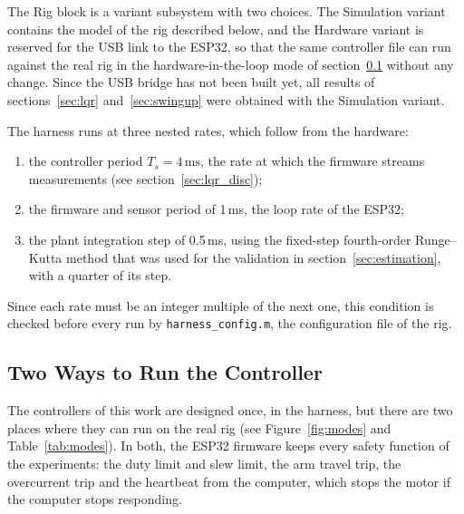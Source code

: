 \documentclass[a4paper,11pt]{article}
\begin{document}
The Rig block is a variant subsystem with two choices. The Simulation variant contains the model of the rig described below, and the Hardware variant is reserved for the USB link to the ESP32, so that the same controller file can run against the real rig in the hardware-in-the-loop mode of section~\ref{sec:harness_modes} without any change. Since the USB bridge has not been built yet, all results of sections~\ref{sec:lqr} and~\ref{sec:swingup} were obtained with the Simulation variant.

The harness runs at three nested rates, which follow from the hardware:
\begin{enumerate}
  \item the controller period $T_s = 4\,\mathrm{ms}$, the rate at which the firmware streams measurements (see section~\ref{sec:lqr_disc});
  \item the firmware and sensor period of 1\,ms, the loop rate of the ESP32;
  \item the plant integration step of 0.5\,ms, using the fixed-step fourth-order Runge--Kutta method that was used for the validation in section~\ref{sec:estimation}, with a quarter of its step.
\end{enumerate}
Since each rate must be an integer multiple of the next one, this condition is checked before every run by \texttt{harness\_config.m}, the configuration file of the rig.

\subsection{Two Ways to Run the Controller}
\label{sec:harness_modes}
The controllers of this work are designed once, in the harness, but there are two places where they can run on the real rig (see Figure~\ref{fig:modes} and Table~\ref{tab:modes}). In both, the ESP32 firmware keeps every safety function of the experiments: the duty limit and slew limit, the arm travel trip, the overcurrent trip and the heartbeat from the computer, which stops the motor if the computer stops responding.
\end{document}
